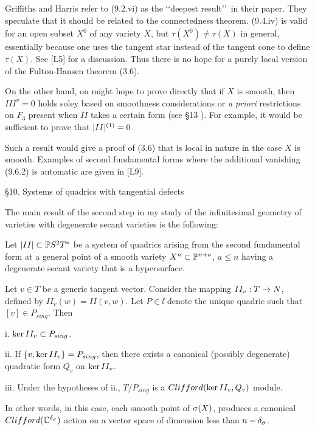   Griffiths and Harris refer
to (9.2.vi) as the \lq\lq  deepest result\rq\rq\ 
in their paper. They speculate that it should be related to the
connectedness
theorem. (9.4.iv) is valid for an open subset $X^0$ of
any variety $X$, but
$\overline{\tau (X^0)}\neq\tau (X)$ in general, essentially
because one uses the tangent star instead of the tangent
cone to define $\tau (X)$. See [L5] for a discussion.
Thus there is no hope for a purely local version of the
Fulton-Hansen theorem (3.6). 


On the other hand, on might hope to prove
directly that if $X$ is smooth, then 
$III^v=0$
holds soley based on smoothness considerations
or {\it a priori} restrictions on $F_3$ present
when  $II$ takes
a certain form (see \S 13 ). For example, it would
be sufficient to prove that $|II|{}^{({1})}=0$.

 Such a result would
give a proof of (3.6) that is local in nature in the case $X$
is smooth. Examples of second fundamental forms
 where  the additional vanishing
(9.6.2) is automatic are given in [L9].

 
 
 \heading\S 10.  Systems of quadrics with tangential defects\endheading

 

 

The main  result 
of the second step in my study of  the infinitesimal
geometry of varieties with degenerate secant varieties is the following:


Let $| II |\subset\Bbb P S^2T^*$ be a system of quadrics arising from the second
fundamental form at a general point of
a smooth variety
  $X^n\subset\Bbb P^{n+a}$, $a\leq n$  having a 
  degenerate secant variety 
that is a hypersurface.  


Let $v\in T$ be a generic tangent vector. Consider the mapping
$II_v :T\rightarrow N$, defined by $II_v(w)=II(v,w)$. Let 
  $P\in\ii$ denote the unique quadric such that $[v]\in P_{sing}$.
Then

 i. $\text{ker}\, II_v\subset P_{sing}$.

ii. If 
$\{ v, \text{ker}\, II_v\}= P_{sing}$, then there exists a canonical (possibly
degenerate) quadratic form $Q_v$ on $\text{ker}\, II_v$.

iii. Under the hypotheses of ii., 
$T/P_{sing}$ is a $Clifford(\text{ker}\, II_v, Q_v)$ module.

In other words, in this case,   each smooth point of $\sigma (X)$, produces a
canonical
$Clifford(\Bbb C^{\delta_{\sigma}} )$ action on a vector space of dimension less
than $n-\delta_{\sigma}$.
\endproclaim


